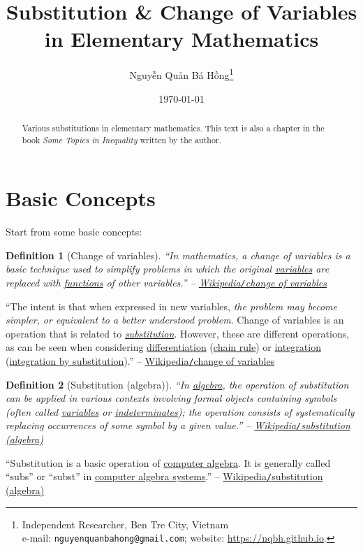 \documentclass{article}
\title{Substitution \& Change of Variables in Elementary Mathematics}
\author{\selectlanguage{vietnamese} Nguyễn Quản Bá Hồng\footnote{Independent Researcher, Ben Tre City, Vietnam\\e-mail: \texttt{nguyenquanbahong@gmail.com}; website: \url{https://nqbh.github.io}.}}
\date{\today}
\numberwithin{equation}{section}
\newtheorem{definition}{Definition}[section]
\begin{document}
\maketitle
{}
\begin{abstract}
	Various substitutions in elementary mathematics. This text is also a chapter in the book \textit{Some Topics in Inequality} written by the author.
\end{abstract}

\tableofcontents
{}


\section{Basic Concepts}
Start from some basic concepts:

\begin{definition}[Change of variables]
	``In mathematics, a \emph{change of variables} is a basic technique used to simplify problems in which the original \href{https://en.wikipedia.org/wiki/Variable_(mathematics)}{variables} are replaced with \href{https://en.wikipedia.org/wiki/Function_(mathematics)}{functions} of other variables.'' -- \href{https://en.wikipedia.org/wiki/Change_of_variables}{Wikipedia\emph{\texttt{/}}change of variables}
\end{definition}
``The intent is that when expressed in new variables, \textit{the problem may become simpler, or equivalent to a better understood problem}. Change of variables is an operation that is related to \href{https://en.wikipedia.org/wiki/Substitution_(algebra)}{\textit{substitution}}. However, these are different operations, as can be seen when considering \href{https://en.wikipedia.org/wiki/Derivative}{differentiation} (\href{https://en.wikipedia.org/wiki/Chain_rule}{chain rule}) or \href{https://en.wikipedia.org/wiki/Integral}{integration} (\href{https://en.wikipedia.org/wiki/Integration_by_substitution}{integration by substitution}).'' -- \href{https://en.wikipedia.org/wiki/Change_of_variables}{Wikipedia\texttt{/}change of variables}

\begin{definition}[Substitution (algebra)]
	``In \href{https://en.wikipedia.org/wiki/Algebra}{algebra}, the operation of \emph{substitution} can be applied in various contexts involving formal objects containing symbols (often called \href{https://en.wikipedia.org/wiki/Variable_(mathematics)}{variables} or \href{https://en.wikipedia.org/wiki/Indeterminate_(variable)}{indeterminates}); the operation consists of systematically replacing occurrences of some symbol by a given value.'' -- \href{https://en.wikipedia.org/wiki/Substitution_(algebra)}{Wikipedia\emph{\texttt{/}}substitution (algebra)}
\end{definition}
``Substitution is a basic operation of \href{https://en.wikipedia.org/wiki/Computer_algebra}{computer algebra}. It is generally called ``subs'' or ``subst'' in \href{https://en.wikipedia.org/wiki/Computer_algebra_system}{computer algebra systems}.'' -- \href{https://en.wikipedia.org/wiki/Substitution_(algebra)}{Wikipedia\texttt{/}substitution (algebra)}
\end{document}
